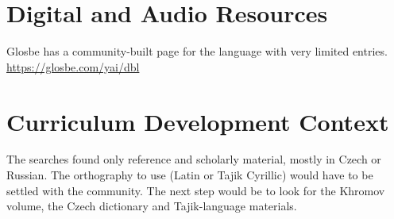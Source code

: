 \documentclass[12pt]{article}
\begin{document}
\section{Digital and Audio Resources}
Glosbe has a community-built page for the language with very limited entries. \url{https://glosbe.com/yai/dbl}

\section{Curriculum Development Context}
The searches found only reference and scholarly material, mostly in Czech or Russian. The orthography to use (Latin or Tajik Cyrillic) would have to be settled with the community. The next step would be to look for the Khromov volume, the Czech dictionary and Tajik-language materials.
\end{document}
